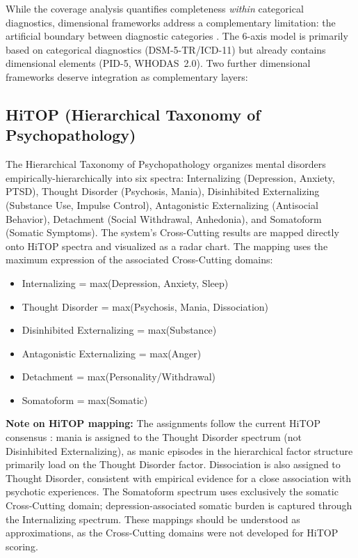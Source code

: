 \documentclass[11pt,a4paper]{article}
\begin{document}
While the coverage analysis quantifies completeness \textit{within} categorical diagnostics, dimensional frameworks address a complementary limitation: the artificial boundary between diagnostic categories \citep{Rosenman2003}. The 6-axis model is primarily based on categorical diagnostics (DSM-5-TR/ICD-11) but already contains dimensional elements (PID-5, WHODAS~2.0). Two further dimensional frameworks deserve integration as complementary layers:

\subsection{HiTOP (Hierarchical Taxonomy of Psychopathology)}

The Hierarchical Taxonomy of Psychopathology \citep{Kotov2017, Kotov2022, Krueger2018} organizes mental disorders empirically-hierarchically into six spectra: Internalizing (Depression, Anxiety, PTSD), Thought Disorder (Psychosis, Mania), Disinhibited Externalizing (Substance Use, Impulse Control), Antagonistic Externalizing (Antisocial Behavior), Detachment (Social Withdrawal, Anhedonia), and Somatoform (Somatic Symptoms). The system's Cross-Cutting results are mapped directly onto HiTOP spectra and visualized as a radar chart. The mapping uses the maximum expression of the associated Cross-Cutting domains:

\begin{itemize}[noitemsep]
\item Internalizing = max(Depression, Anxiety, Sleep)
\item Thought Disorder = max(Psychosis, Mania, Dissociation)
\item Disinhibited Externalizing = max(Substance)
\item Antagonistic Externalizing = max(Anger)
\item Detachment = max(Personality/Withdrawal)
\item Somatoform = max(Somatic)
\end{itemize}

\textbf{Note on HiTOP mapping:} The assignments follow the current HiTOP consensus \citep{Kotov2021}: mania is assigned to the Thought Disorder spectrum (not Disinhibited Externalizing), as manic episodes in the hierarchical factor structure primarily load on the Thought Disorder factor. Dissociation is also assigned to Thought Disorder, consistent with empirical evidence for a close association with psychotic experiences. The Somatoform spectrum uses exclusively the somatic Cross-Cutting domain; depression-associated somatic burden is captured through the Internalizing spectrum. These mappings should be understood as approximations, as the Cross-Cutting domains were not developed for HiTOP scoring.
\end{document}
